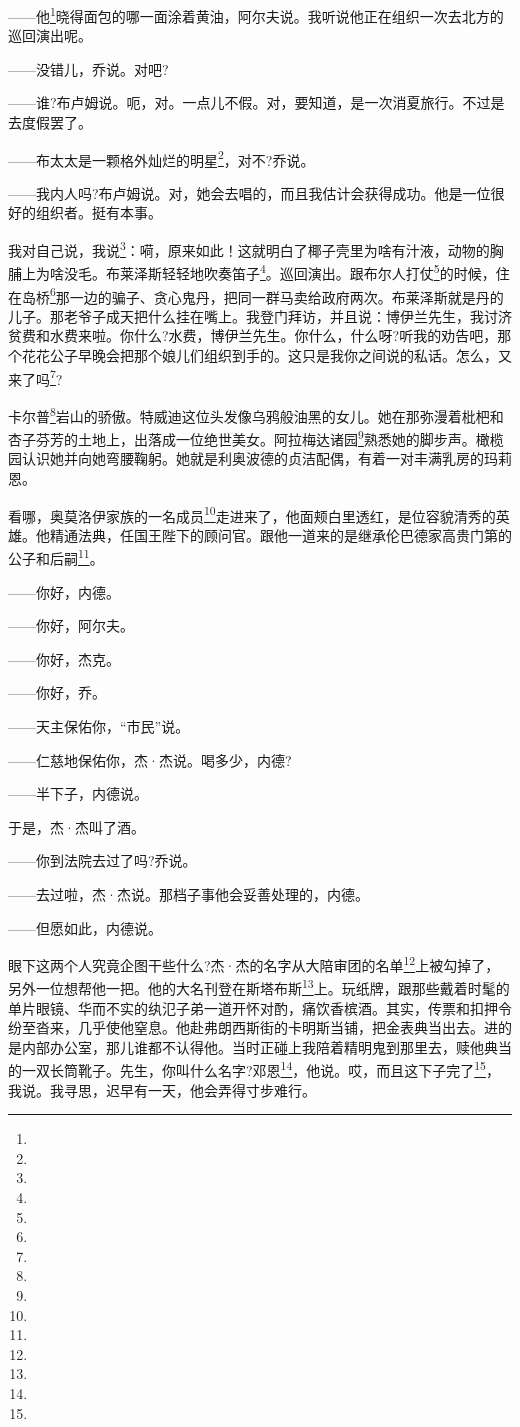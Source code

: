 \par ——他\footnote{}晓得面包的哪一面涂着黄油，阿尔夫说。我听说他正在组织一次去北方的巡回演出呢。
\par ——没错儿，乔说。对吧?
\par ——谁?布卢姆说。呃，对。一点儿不假。对，要知道，是一次消夏旅行。不过是去度假罢了。
\par ——布太太是一颗格外灿烂的明星\footnote{}，对不?乔说。
\par ——我内人吗?布卢姆说。对，她会去唱的，而且我估计会获得成功。他是一位很好的组织者。挺有本事。
\par 我对自己说，我说\footnote{}：嗬，原来如此！这就明白了椰子壳里为啥有汁液，动物的胸脯上为啥没毛。布莱泽斯轻轻地吹奏笛子\footnote{}。巡回演出。跟布尔人打仗\footnote{}的时候，住在岛桥\footnote{}那一边的骗子、贪心鬼丹，把同一群马卖给政府两次。布莱泽斯就是丹的儿子。那老爷子成天把什么挂在嘴上。我登门拜访，并且说：博伊兰先生，我讨济贫费和水费来啦。你什么?水费，博伊兰先生。你什么，什么呀?听我的劝告吧，那个花花公子早晚会把那个娘儿们组织到手的。这只是我你之间说的私话。怎么，又来了吗\footnote{}?
\par 卡尔普\footnote{}岩山的骄傲。特威迪这位头发像乌鸦般油黑的女儿。她在那弥漫着枇杷和杏子芬芳的土地上，出落成一位绝世美女。阿拉梅达诸园\footnote{}熟悉她的脚步声。橄榄园认识她并向她弯腰鞠躬。她就是利奥波德的贞洁配偶，有着一对丰满乳房的玛莉恩。
\par 看哪，奥莫洛伊家族的一名成员\footnote{}走进来了，他面颊白里透红，是位容貌清秀的英雄。他精通法典，任国王陛下的顾问官。跟他一道来的是继承伦巴德家高贵门第的公子和后嗣\footnote{}。
\par ——你好，内德。
\par ——你好，阿尔夫。
\par ——你好，杰克。
\par ——你好，乔。
\par ——天主保佑你，“市民”说。
\par ——仁慈地保佑你，杰·杰说。喝多少，内德?
\par ——半下子，内德说。
\par 于是，杰·杰叫了酒。
\par ——你到法院去过了吗?乔说。
\par ——去过啦，杰·杰说。那档子事他会妥善处理的，内德。
\par ——但愿如此，内德说。
\par 眼下这两个人究竟企图干些什么?杰·杰的名字从大陪审团的名单\footnote{}上被勾掉了，另外一位想帮他一把。他的大名刊登在斯塔布斯\footnote{}上。玩纸牌，跟那些戴着时髦的单片眼镜、华而不实的纨氾子弟一道开怀对酌，痛饮香槟酒。其实，传票和扣押令纷至沓来，几乎使他窒息。他赴弗朗西斯街的卡明斯当铺，把金表典当出去。进的是内部办公室，那儿谁都不认得他。当时正碰上我陪着精明鬼到那里去，赎他典当的一双长筒靴子。先生，你叫什么名字?邓恩\footnote{}，他说。哎，而且这下子完了\footnote{}，我说。我寻思，迟早有一天，他会弄得寸步难行。
